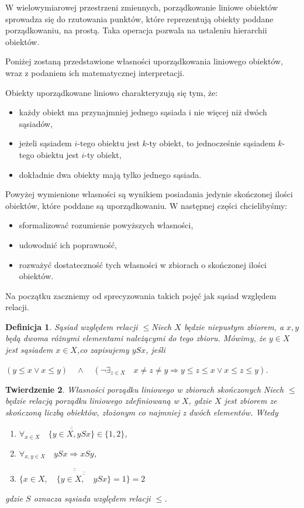 \documentclass[12pt,a4paper]{report}
\newtheorem{theorem}{Twierdzenie}[section]
\newtheorem{definition}[theorem]{Definicja}
\newcommand{\licznosc}[1]{\overline{\overline{#1}}}
\begin{document}
W wielowymiarowej przestrzeni zmiennych, porządkowanie liniowe obiektów sprowadza się do rzutowania punktów, które reprezentują obiekty poddane porządkowaniu, na prostą.  Taka operacja pozwala na ustaleniu hierarchii obiektów.

Poniżej zostaną przedstawione własności uporządkowania liniowego obiektów, wraz z podaniem ich matematycznej interpretacji.

Obiekty uporządkowane liniowo charakteryzują się tym, że:
\begin{itemize}
\item każdy obiekt ma przynajmniej jednego sąsiada i nie więcej niż dwóch sąsiadów,
\item jeżeli sąsiadem $i$-tego obiektu jest $k$-ty obiekt, to jednocześnie sąsiadem $k$-tego obiektu jest $i$-ty obiekt,
\item dokładnie dwa obiekty mają tylko jednego sąsiada.
\end{itemize}


Powyżej wymienione własności są wynikiem posiadania jedynie skończonej ilości obiektów, które poddane są uporządkowaniu. W następnej części chcielibyśmy:
\begin{itemize}
\item sformalizować rozumienie powyższych własności,
\item udowodnić ich poprawność,
\item rozważyć dostateczność tych własności w zbiorach o skończonej ilości obiektów.
\end{itemize}


Na początku zaczniemy od sprecyzowania takich pojęć jak sąsiad względem relacji.

\begin{definition}{Sąsiad względem relacji $\leq$}\label{def-sasiada} 
Niech  $X$ będzie niepustym zbiorem, a $x, y$ będą dwoma różnymi elementami należącymi do tego zbioru. Mówimy, że $y \in X$ jest sąsiadem $x \in X$,co zapisujemy $ySx$, jeśli

$\left(y \leq x \lor x \leq y \right) \quad \land \quad  \left(\lnot \exists_{z \in X}  \quad x\neq z \neq y \Rightarrow   y \leq z \leq x \lor x \leq z \leq y \right)$.
\end{definition}


\begin{theorem}{Własności porządku liniowego w zbiorach skończonych}
Niech $\leq$ będzie relacją porządku liniowego zdefiniowaną w $X$, gdzie $X$ jest zbiorem ze skończoną liczbą obiektów, złożonym co najmniej z dwóch elementów. Wtedy
\begin{enumerate}
\item $\forall_{x \in X} \quad \licznosc{\{y \in X, ySx\}} \in \{1,2\}$,
\item $\forall_{x, y \in X} \quad ySx \Rightarrow xSy $,
\item $\licznosc{\{x \in X, \quad \licznosc{\{y \in X, \quad ySx \}}=1\}}=2$
\end{enumerate}
gdzie $S$ oznacza sąsiada względem relacji $\leq$.
\end{theorem}
\end{document}
